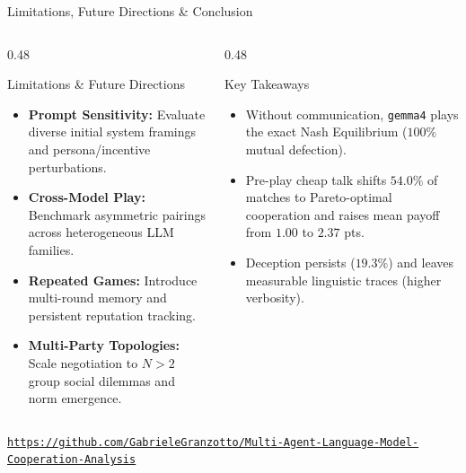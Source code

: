 \documentclass[aspectratio=169, 10pt]{beamer}
\begin{document}
\begin{frame}{Limitations, Future Directions \& Conclusion}
    \small
    \begin{columns}[T, totalwidth=\textwidth]
        \begin{column}{0.48\textwidth}
            \begin{alertblock}{Limitations \& Future Directions}
                \begin{itemize}
                    \setlength{\itemsep}{6pt}
                    \item \textbf{Prompt Sensitivity:} Evaluate diverse initial system framings and persona/incentive perturbations.
                    \item \textbf{Cross-Model Play:} Benchmark asymmetric pairings across heterogeneous LLM families.
                    \item \textbf{Repeated Games:} Introduce multi-round memory and persistent reputation tracking.
                    \item \textbf{Multi-Party Topologies:} Scale negotiation to $N > 2$ group social dilemmas and norm emergence.
                \end{itemize}
            \end{alertblock}
        \end{column}
        \begin{column}{0.48\textwidth}
            \begin{block}{Key Takeaways}
                \begin{itemize}
                    \setlength{\itemsep}{6pt}
                    \item Without communication, \texttt{gemma4} plays the exact Nash Equilibrium ($100\%$ mutual defection).
                    \item Pre-play cheap talk shifts $54.0\%$ of matches to Pareto-optimal cooperation and raises mean payoff from $1.00$ to $2.37$ pts.
                    \item Deception persists ($19.3\%$) and leaves measurable linguistic traces (higher verbosity).
                \end{itemize}
            \end{block}
        \end{column}
    \end{columns}
    \vspace{0.35cm}
    \centering
    \scriptsize\color{SoftSlate}\texttt{\url{https://github.com/GabrieleGranzotto/Multi-Agent-Language-Model-Cooperation-Analysis}}
\end{frame}
\end{document}

